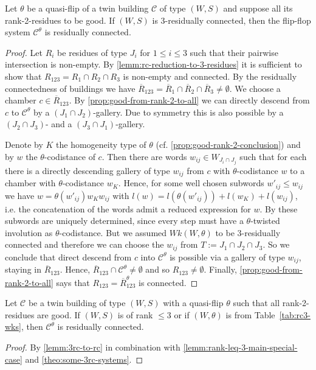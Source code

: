 \begin{lemm}
	Let $\theta$ be a quasi-flip of a twin building $\mathcal C$ of type $(W,S)$ and suppose all its rank-2-residues to be good. If $(W,S)$ is 3-residually connected, then the flip-flop system $\mathcal C^\theta$ is residually connected.

	\begin{proof}
		Let $R_i$ be residues of type $J_i$ for $1 \leq i \leq 3$ such that their pairwise intersection is non-empty. By \ref{lemm:rc-reduction-to-3-residues} it is sufficient to show that $R_{123} = R_1 \cap R_2 \cap R_3$ is non-empty and connected. By the residually connectedness of buildings we have $\overline R_{123} = \overline R_1 \cap \overline R_2 \cap \overline R_3 \neq \emptyset$. We choose a chamber $c \in \overline R_{123}$. By \ref{prop:good-from-rank-2-to-all} we can directly descend from $c$ to $\mathcal C^\theta$ by a $(J_1 \cap J_2)$-gallery. Due to symmetry this is also possible by a $(J_2 \cap J_3)$- and a $(J_3 \cap J_1)$-gallery.

		Denote by $K$ the homogeneity type of $\theta$ (cf. \ref{prop:good-rank-2-conclusion}) and by $w$ the $\theta$-codistance of $c$. Then there are words $w_{ij} \in W_{J_i \cap J_j}$ such that for each there is a directly descending gallery of type $w_{ij}$ from $c$ with $\theta$-codistance $w$ to a chamber with $\theta$-codistance $w_K$. Hence, for some well chosen subwords $w'_{ij} \leq w_{ij}$ we have $w = \theta(w'_{ij}) w_K w_{ij}$ with $l(w) = l(\theta(w'_{ij})) + l(w_K) + l(w_{ij})$, i.e. the concatenation of the words admit a reduced expression for $w$. By  these subwords are uniquely determined, since every step must have a $\theta$-twisted involution as $\theta$-codistance. But we assumed $Wk(W,\theta)$ to be 3-residually connected and therefore we can choose the $w_{ij}$ from $T := J_1 \cap J_2 \cap J_3$. So we conclude that direct descend from $c$ into $\mathcal C^\theta$ is possible via a gallery of type $w_{ij}$, staying in $\overline R_{123}$. Hence, $\overline R_{123} \cap \mathcal C^\theta \neq \emptyset$ and so $R_{123} \neq \emptyset$. Finally, \ref{prop:good-from-rank-2-to-all} says that $R_{123} = \overline R_{123}^\theta$ is connected.
	\end{proof}
\end{lemm}

\begin{coro}
	Let $\mathcal C$ be a twin building of type $(W,S)$ with a quasi-flip $\theta$ such that all rank-2-residues are good. If $(W,S)$ is of rank $\leq 3$ or if $(W,\theta)$ is from Table~\ref{tab:rc3-wks}, then $\mathcal C^\theta$ is residually connected.

	\begin{proof}
		By \ref{lemm:3rc-to-rc} in combination with \ref{lemm:rank-leq-3-main-special-case} and \ref{theo:some-3rc-systems}.
	\end{proof}
\end{coro}
